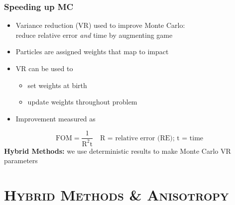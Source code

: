 \documentclass[xcolor=x11names,compress]{beamer}
\renewcommand{\(}{\begin{columns}}
\renewcommand{\)}{\end{columns}}
\newcommand{\<}[1]{\begin{column}{#1}}
\renewcommand{\>}{\end{column}}
\begin{document}
\begin{frame}[fragile]
  \frametitle{Speeding up MC}
  \begin{itemize}
	\item Variance reduction (VR) used to improve Monte Carlo:\\
	reduce relative error \textit{and} time by augmenting game
	\item Particles are assigned weights that map to impact
	\item VR can be used to
	  \begin{itemize}
	  \item set weights at birth
	  \item update weights throughout problem
      \end{itemize}
      \pause
  \item Improvement measured as    
  \end{itemize}
\[
\text{FOM} = \frac{1}{\text{R}^2\text{t}} \quad \text{R = relative error (RE);  t = time} 
\]
\pause
\textbf{Hybrid Methods:} we use deterministic results to make Monte Carlo VR parameters

\end{frame}


\section{\scshape Hybrid Methods \& Anisotropy}
\end{document}
